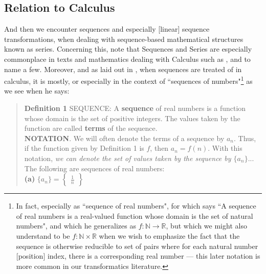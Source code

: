 \documentclass[a4paper, 18pt]{book} %
\begin{document}
\begin{appendices}
\subsection{Relation to Calculus}
\label{SECRELCALCULUS}

And then we encounter sequences and especially [linear] sequence transformations, when dealing with sequence-based mathematical structures known as series. Concerning this, note that Sequences and Series are especially commonplace in texts and mathematics dealing with Calculus such as \cite{ronlarsoncalculus}, \cite{fitzpatrick1995advanced} and \cite{Grossman1986CalculusOneVariable} to name a few. Moreover, and as laid out in \cite{Grossman1986CalculusOneVariable}, when sequences are treated of in calculus, it is mostly, or especially in the context of ``sequences of numbers"\footnote{In fact, especially as ``sequence of real numbers", for which  \cite{fitzpatrick1995advanced} says ``A sequence of real numbers is a real-valued function whose domain is the set of natural numbers", and which he generalizes as $f:\mathbb{N} \rightarrow \mathbb{R}$, but which we might also understand to be $f: \mathbb{N} \times \mathbb{R}$ when we wish to emphasize the fact that the sequence is otherwise reducible to set of pairs where for each natural number [position] index, there is a corresponding real number --- this later notation is more common in our transformatics literature.} as we see when he says:


\noindent
\begin{minipage}{1\textwidth}
\vspace{1em}
\begin{quotation}
{\ttfamily

\textbf{Definition 1} SEQUENCE: A \textbf{sequence} of real numbers is a function whose domain is the set of positive integers. The values taken by the function are called \textbf{terms} of the sequence.\\

\textbf{NOTATION}. We will often denote the terms of a sequence by $a_n$. Thus, if the function given by Definition 1 is $f$, then $a_n = f(n)$. With this notation, \textit{we can denote the set of values taken by the sequence by $\{a_n\}$}...\\

The following are sequences of real numbers:\\

\textbf{(a)} $\{a_n\} = \begin{Bmatrix}\frac{1}{n}\end{Bmatrix}$\\ 

}
\end{quotation}
\end{minipage}
\end{appendices}
\end{document}
